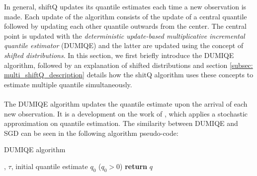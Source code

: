 In general, shiftQ updates its quantile estimates each time a new observation is made. Each update of the algorithm consists of the update of a central quantile followed by updating each other quantile outwards from the center. The central point is updated with the \emph{deterministic update-based multiplicative incremental quantile estimator} (DUMIQE) and the latter are updated using the concept of \emph{shifted distributions}. In this section, we first briefly introduce the DUMIQE algorithm, followed by an explanation of shifted distributions and section \ref{subsec: multi_shiftQ_description} details how the shitQ algorithm uses these concepts to estimate multiple quantile simultaneously.
\\\\
The DUMIQE algorithm updates the quantile estimate upon the arrival of each new observation. It is a development on the work of \citeauthor{tierneySpaceEfficientRecursiveProcedure1983}\cite{tierneySpaceEfficientRecursiveProcedure1983}, which applies a stochastic approximation on quantile estimation. The similarity between DUMIQE and SGD can be seen in the following algorithm pseudo-code:

\begin{algorithm}
    \caption{DUMIQE algorithm}\label{alg:DUMIQE}
    \begin{algorithmic}[1]
        , $\tau$, initial quantile estimate $q_0$ ($q_0 > 0$)
                                 
                              
                \Else                           
                \EndIf
            \EndFor
        \State \textbf{return} $q$              
    \end{algorithmic}
\end{algorithm}

